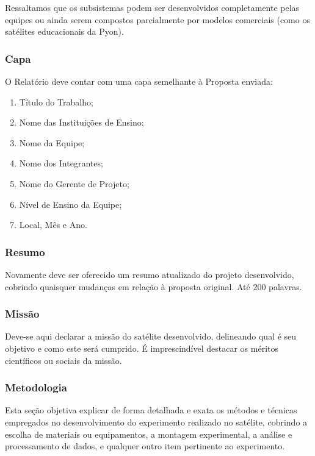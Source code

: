         Ressaltamos que os subsistemas podem ser desenvolvidos completamente pelas equipes ou ainda serem compostos parcialmente por modelos comerciais (como os satélites educacionais da Pyon).
        
        \subsubsection{Capa}
            O Relatório deve contar com uma capa semelhante à Proposta enviada:
            \begin{enumerate}
                \item Título do Trabalho; 
                \item Nome das Instituições de Ensino; 
                \item Nome da Equipe; 
                \item Nome dos Integrantes; 
                \item Nome do Gerente de Projeto;
                \item Nível de Ensino da Equipe;
                \item Local, Mês e Ano. 
            \end{enumerate}
            
        \subsubsection{Resumo}
            Novamente deve ser oferecido um resumo atualizado do projeto desenvolvido, cobrindo quaisquer mudanças em relação à proposta original. Até 200 palavras.
        
        \subsubsection{Missão}
            Deve-se aqui declarar a missão do satélite desenvolvido, delineando qual é seu objetivo e como este será cumprido. É imprescindível destacar os méritos científicos ou sociais da missão.
        
        \subsubsection{Metodologia}
            Esta seção objetiva explicar de forma detalhada e exata os métodos e técnicas empregados no desenvolvimento do experimento realizado no satélite, cobrindo a escolha de materiais ou equipamentos, a montagem experimental, a análise e processamento de dados, e qualquer outro item pertinente ao experimento.

